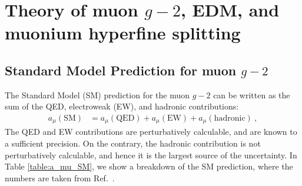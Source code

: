 \section{Theory of muon $g-2$, EDM, and muonium hyperfine splitting}

\def\hpz{\hphantom{0}} \def\hpzz{\hphantom{00}} \def\hph{\hphantom{-}}

\subsection{Standard Model Prediction for muon $g-2$}

The Standard Model (SM) prediction for the muon $g-2$
can be written as the sum of the QED, electroweak (EW), and
hadronic contributions:
%
\begin{align}
   a_\mu(\text{SM})
&=   a_\mu(\text{QED}) +  a_\mu(\text{EW})
   + a_\mu(\text{hadronic})~,
\end{align}
%
The QED and EW contributions are perturbatively calculable,
and are known to a sufficient precision.  On the contrary,
the hadronic contribution is not perturbatively calculable,
and hence it is the largest source of the uncertainty.
In Table \ref{table:a_mu_SM}, we show a breakdown of the
SM prediction, where the numbers are taken from Ref.~\cite{KNT18}.


